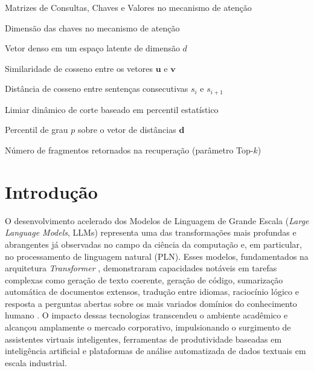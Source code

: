\documentclass[
	12pt,				%
	openright,			%
	oneside,			%
	a4paper,			%
	tccpreliminar,		%
	]{ABNT-DC-UEL}
\begin{document}
\begin{simbolos}
  \item[$ Q, K, V $] Matrizes de Consultas, Chaves e Valores no mecanismo de atenção
  \item[$ d_k $] Dimensão das chaves no mecanismo de atenção
  \item[$ \mathbf{v} \in \mathbb{R}^d $] Vetor denso em um espaço latente de dimensão $d$
  \item[$ \text{sim}(\mathbf{u}, \mathbf{v}) $] Similaridade de cosseno entre os vetores $\mathbf{u}$ e $\mathbf{v}$
  \item[$ d_i $] Distância de cosseno entre sentenças consecutivas $s_i$ e $s_{i+1}$
  \item[$ T $] Limiar dinâmico de corte baseado em percentil estatístico
  \item[$ P_p(\mathbf{d}) $] Percentil de grau $p$ sobre o vetor de distâncias $\mathbf{d}$
  \item[$ k $] Número de fragmentos retornados na recuperação (parâmetro Top-$k$)
\end{simbolos}

\tableofcontents*
\cleardoublepage



\textual
\pagestyle{dc-uel-header}


\chapter{Introdução}
\label{cap:introducao}

O desenvolvimento acelerado dos Modelos de Linguagem de Grande Escala (\textit{Large Language Models}, LLMs) representa uma das transformações mais profundas e abrangentes já observadas no campo da ciência da computação e, em particular, no processamento de linguagem natural (PLN). Esses modelos, fundamentados na arquitetura \textit{Transformer} \cite{vaswani2017attention}, demonstraram capacidades notáveis em tarefas complexas como geração de texto coerente, geração de código, sumarização automática de documentos extensos, tradução entre idiomas, raciocínio lógico e resposta a perguntas abertas sobre os mais variados domínios do conhecimento humano \cite{brown2020fewshot}. O impacto dessas tecnologias transcendeu o ambiente acadêmico e alcançou amplamente o mercado corporativo, impulsionando o surgimento de assistentes virtuais inteligentes, ferramentas de produtividade baseadas em inteligência artificial e plataformas de análise automatizada de dados textuais em escala industrial.
\end{document}
